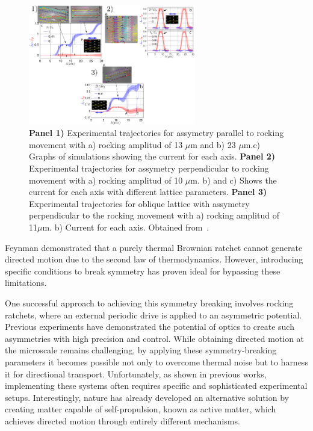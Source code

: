\begin{figure}[h]
  \begin{center}
    \includegraphics[width=0.65\textwidth]{figures/ArzolaExperiment.png}
  \end{center}
  \caption[Arzola experiment.]{\textbf{Panel 1)} Experimental trajectories for  assymetry parallel to rocking movement with a) rocking amplitud of 13 $\mu$m and b) 23 $\mu$m.c) Graphs of simulations showing the current for each axis. \textbf{Panel 2)} Experimental trajectories for assymetry perpendicular to rocking movement with a) rocking amplitud of 10 $\mu$m. b) and c) Shows the current for each axis with different lattice parameters. \textbf{Panel 3)} Experimental trajectories for oblique lattice with assymetry perpendicular to the rocking movement with a) rocking amplitud of 11$\mu$m. b) Current for each axis. Obtained from~\cite{arzola2017omnidirectional}.}\label{fig:arzolaexperiment}
\end{figure}

Feynman demonstrated that a purely thermal Brownian ratchet cannot generate directed motion due to the second law of thermodynamics. However, introducing specific conditions to break symmetry has proven ideal for bypassing these limitations.

One successful approach to achieving this symmetry breaking involves rocking ratchets, where an external periodic drive is applied to an asymmetric potential. Previous experiments have demonstrated the potential of optics to create such asymmetries with high precision and control. While obtaining directed motion at the microscale remains challenging, by applying these symmetry-breaking parameters it becomes possible not only to overcome thermal noise but to harness it for directional transport. Unfortunately, as shown in previous works, implementing these systems often requires specific and sophisticated experimental setups. Interestingly, nature has already developed an alternative solution by creating matter capable of self-propulsion, known as active matter, which achieves directed motion through entirely different mechanisms.


